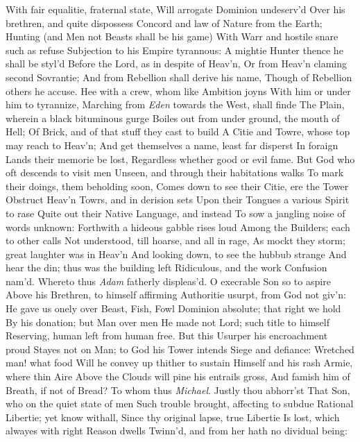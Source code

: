 \documentclass[11pt]{book}
\begin{document}
With fair equalitie, fraternal state, 
Will arrogate Dominion undeserv'd 
Over his brethren, and quite dispossess 
Concord and law of Nature from the Earth; 
Hunting (and Men not Beasts shall be his game) 
With Warr and hostile snare such as refuse 
Subjection to his Empire tyrannous: 
A mightie Hunter thence he shall be styl'd 
Before the Lord, as in despite of Heav'n, 
Or from Heav'n claming second Sovrantie; 
And from Rebellion shall derive his name, 
Though of Rebellion others he accuse. 
Hee with a crew, whom like Ambition joyns 
With him or under him to tyrannize, 
Marching from \textit{Eden} towards the West, shall finde 
The Plain, wherein a black bituminous gurge 
Boiles out from under ground, the mouth of Hell; 
Of Brick, and of that stuff they cast to build 
A Citie and Towre, whose top may reach to Heav'n; 
And get themselves a name, least far disperst 
In foraign Lands their memorie be lost, 
Regardless whether good or evil fame. 
But God who oft descends to visit men 
Unseen, and through their habitations walks 
To mark their doings, them beholding soon, 
Comes down to see their Citie, ere the Tower 
Obstruct Heav'n Towrs, and in derision sets 
Upon their Tongues a various Spirit to rase 
Quite out their Native Language, and instead 
To sow a jangling noise of words unknown: 
Forthwith a hideous gabble rises loud 
Among the Builders; each to other calls 
Not understood, till hoarse, and all in rage, 
As mockt they storm; great laughter was in Heav'n 
And looking down, to see the hubbub strange 
And hear the din; thus was the building left 
Ridiculous, and the work Confusion nam'd. 
\quad Whereto thus \textit{Adam} fatherly displeas'd. 
O execrable Son so to aspire 
Above his Brethren, to himself affirming 
Authoritie usurpt, from God not giv'n: 
He gave us onely over Beast, Fish, Fowl 
Dominion absolute; that right we hold 
By his donation; but Man over men 
He made not Lord; such title to himself 
Reserving, human left from human free. 
But this Usurper his encroachment proud 
Stayes not on Man; to God his Tower intends 
Siege and defiance: Wretched man! what food 
Will he convey up thither to sustain 
Himself and his rash Armie, where thin Aire 
Above the Clouds will pine his entrails gross, 
And famish him of Breath, if not of Bread? 
\quad To whom thus \textit{Michael}.  Justly thou abhorr'st 
That Son, who on the quiet state of men 
Such trouble brought, affecting to subdue 
Rational Libertie; yet know withall, 
Since thy original lapse, true Libertie 
Is lost, which alwayes with right Reason dwells 
Twinn'd, and from her hath no dividual being: 
\end{document}
